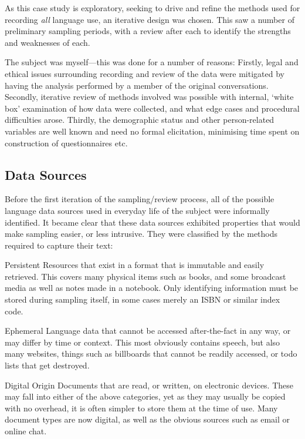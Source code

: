 As this case study is exploratory, seeking to drive and refine the methods used for recording \textsl{all} language use, an iterative design was chosen.  This saw a number of preliminary sampling periods, with a review after each to identify the strengths and weaknesses of each.

The subject was myself---this was done for a number of reasons:  Firstly, legal and ethical issues surrounding recording and review of the data were mitigated by having the analysis performed by a member of the original conversations.
Secondly, iterative review of methods involved was possible with internal, `white box' examination of how data were collected, and what edge cases and procedural difficulties arose.
Thirdly, the demographic status and other person-related variables are well known and need no formal elicitation, minimising time spent on construction of questionnaires etc.


\subsection{Data Sources}
Before the first iteration of the sampling/review process, all of the possible language data sources used in everyday life of the subject were informally identified.  It became clear that these data sources exhibited properties that would make sampling easier, or less intrusive.  They were classified by the methods required to capture their text:

\begin{itemizeTitle}
    \item[Persistent] Resources that exist in a format that is immutable and easily retrieved.  This covers many physical items such as books, and some broadcast media as well as notes made in a notebook.  Only identifying information must be stored during sampling itself, in some cases merely an ISBN or similar index code.
    \item[Ephemeral] Language data that cannot be accessed after-the-fact in any way, or may differ by time or context.  This most obviously contains speech, but also many websites, things such as billboards that cannot be readily accessed, or todo lists that get destroyed.
    \item[Digital Origin] Documents that are read, or written, on electronic devices.  These may fall into either of the above categories, yet as they may usually be copied with no overhead, it is often simpler to store them at the time of use.  Many document types are now digital, as well as the obvious sources such as email or online chat.
\end{itemizeTitle}

